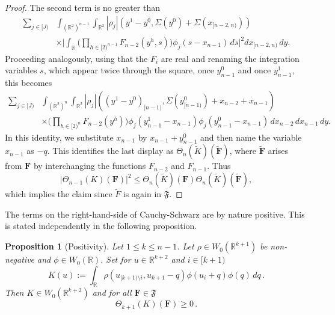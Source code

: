 \documentclass[12pt,reqno]{amsart}
\theoremstyle{plain}
\newtheorem{proposition}[theorem]{Proposition}
\numberwithin{equation}{section}
\theoremstyle{remark}
\newcommand{\R}{{\mathbb R}}
\newcommand{\F}{\mathbf{F}}
\begin{document}
\begin{proof}
The second term is no greater than
\begin{equation}
\begin{aligned}
\sum_{j\in[J)} & \int_{(\R^2)^{n-1}} \int_{\R^2}
|\rho_j|(y^1-y^0, \Sigma(y^0)+\Sigma(x_{[n-2,n)}))
\\
&\times
\Big|
 \int_{\R} \Big(\prod_{h\in [2)^{n-1}} F_{n-2}(y^h,s)\Big)
\phi_j(s-x_{n-1})\,ds
\Big|^2
    dx_{[n-2,n)}\,dy .
\end{aligned}
\end{equation}
Proceeding analogously, using that the $F_i$ are real and renaming the integration variables $s$, which appear twice
through the square, once $y_{n-1}^0$ and once $y_{n-1}^1$, this becomes
\begin{equation}
\begin{aligned}
\sum_{j\in[J)} & \int_{(\R^2)^n}\int_{\R^2}
|\rho_j|((y^1-y^0)_{[n-1)},\Sigma(y^0_{[n-1)})+x_{n-2}+x_{n-1})
\\
&\times
\Big(\prod_{h\in[2)^n}F_{n-2}(y^h)\Big)
\phi_j(y_{n-1}^1-x_{n-1})\phi_j(y_{n-1}^0-x_{n-1})
\,dx_{n-2}\,dx_{n-1}\,dy .
\end{aligned}
\end{equation}
In this identity, we substitute $x_{n-1}$ by $x_{n-1}+y_{n-1}^0$ and then name the variable $x_{n-1}$ as $-q$.
This identifies the last display as $\Theta_n(\tilde K)(\mathbf{\tilde F})$, where $\mathbf{\tilde F}$ arises from $\F$ by interchanging the functions $F_{n-2}$ and $F_{n-1}$.
Thus
\begin{equation}
    |\Theta_{n-1}(K)(\F)|^2
    \le \Theta_n(\tilde K)(\F)\Theta_n(\tilde K)(\mathbf{\tilde F}),
\end{equation}
which implies the claim since $\tilde{F}$ is again in $\mathfrak{F}$.
\end{proof}

The terms on the right-hand-side of Cauchy-Schwarz are by nature positive. This is
stated independently in the following proposition.
\begin{proposition}[Positivity]\label{Positivity K}
 Let $1\le k\le n-1$. Let $\rho\in W_0(\R^{k+1})$ be non-negative and
$\phi\in W_0(\R)$. Set for $u\in\R^{k+2}$ and $i\in [k+1)$
\begin{equation}\label{auto:positive-kernel-K}
    K(u):=\int_\R \rho(u_{[k+1)\setminus i}, u_{k+1}-q) \phi(u_{i}+q) \phi(q) \, dq\, .
\end{equation}
Then $K\in W_0(\R^{k+2})$ and for all $\mathbf{F}\in\mathfrak{F}$
\begin{equation}\label{auto:positive-K-form}
    \Theta_{k+1}(K)(\F)\ge 0\, .
\end{equation}
\end{proposition}
\end{document}
